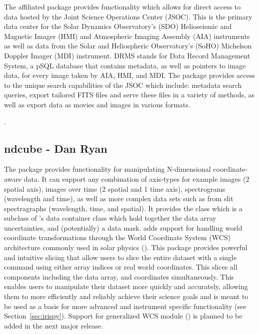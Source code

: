 The  affiliated package provides functionality which allows for direct access to data hosted by the Joint Science Operations Center (JSOC). 
This is the primary data center for the Solar Dynamics Observatory’s (SDO) Helioseismic and Magnetic Imager (HMI) and Atmospheric Imaging Assembly (AIA) instruments as well as data from the Solar and Heliospheric Observatory's (SoHO) Michelson Doppler Imager (MDI) instrument. 
DRMS stands for Data Record Management System, a pSQL database that contains metadata, as well as pointers to image data, for every image taken by AIA, HMI, and MDI. 
The  package provides access to the unique search capabilities of the JSOC which include: metadata search queries, export tailored FITS files and serve these files in a variety of methods, as well as export data as movies and images in various formats.

.

\subsection{ndcube - Dan Ryan}
\label{sec:ndcube}

The  package provides functionality for manipulating N-dimensional coordinate-aware data.  
It can support any combination of axis-types for example
images (2 spatial axis), images over time (2 spatial and 1 time axis), spectrograms
(wavelength and time), as well as more complex data sets such as from slit spectragraphs (wavelength, time, and spatial). 
It provides the class  which is a
subclass of \astropy's  data container class which hold together
the data array uncertainties, and (potentially) a data mask. 
 adds
support for handling world coordinate transformations through the World Coordinate System (WCS) architecture commonly used in solar physics (). 
This package provides powerful and intuitive slicing that allow users to slice the entire dataset with a single command using either array indices or real world coordinates. 
This slices all components including the data array, and coordinates simultaneously. 
This enables users to manipulate their dataset more quickly and accurately, allowing them to more efficiently and reliably achieve their science goals and is meant to be used as a basis for more advanced and instrument specific functionality (see Section~\ref{sec:irispy}). 
Support for generalized WCS module () is planned to be added in the next major release.

